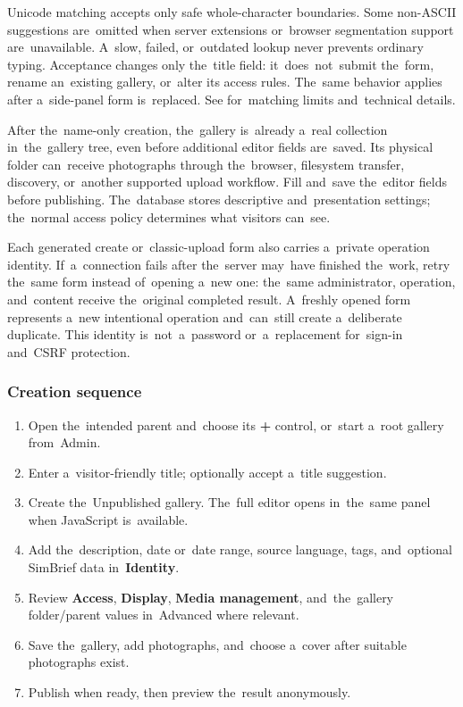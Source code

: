 \documentclass[11pt,a4paper]{article}
\newcommand{\filepath}[1]{\path{#1}}
\newcommand{\ui}[1]{\textbf{#1}}
\begin{document}
Unicode matching accepts only safe whole-character boundaries. Some non-ASCII
suggestions are~omitted when server extensions or~browser segmentation support
are~unavailable. A~slow, failed, or~outdated lookup never prevents ordinary
typing. Acceptance changes only the~title field: it~does~not~submit the~form,
rename an~existing gallery, or~alter its access rules. The~same behavior applies
after a~side-panel form is~replaced. See \filepath{docs/TITLE_COMPLETION.md}
for~matching limits and~technical details.

After the~name-only creation, the~gallery is~already a~real collection
in~the~gallery tree, even before additional editor fields are~saved. Its
physical folder can~receive photographs through the~browser, filesystem
transfer, discovery, or~another supported upload workflow. Fill and~save
the~editor fields before publishing. The~database stores descriptive
and~presentation settings; the~normal access policy determines what visitors
can~see.

Each generated create or~classic-upload form also carries a~private operation
identity. If~a~connection fails after the~server may~have finished the~work,
retry the~same form instead of~opening a~new one: the~same administrator,
operation, and~content receive the~original completed result. A~freshly opened
form represents a~new intentional operation and~can~still create a~deliberate
duplicate. This identity is~not~a~password or~a~replacement for~sign-in and~CSRF
protection.

\subsubsection{Creation sequence}

\begin{enumerate}
  \item Open the~intended parent and~choose its \ui{+} control, or~start a~root
  gallery from~Admin.
  \item Enter a~visitor-friendly title; optionally accept a~title suggestion.
  \item Create the~Unpublished gallery. The~full editor opens in~the~same panel
  when JavaScript is~available.
  \item Add the~description, date or~date range, source language, tags,
  and~optional SimBrief data in~\ui{Identity}.
  \item Review \ui{Access}, \ui{Display}, \ui{Media management}, and~the~gallery
  folder/parent values in~Advanced where relevant.
  \item Save the~gallery, add photographs, and~choose a~cover after suitable
  photographs exist.
  \item Publish when ready, then preview the~result anonymously.
\end{enumerate}
\end{document}
